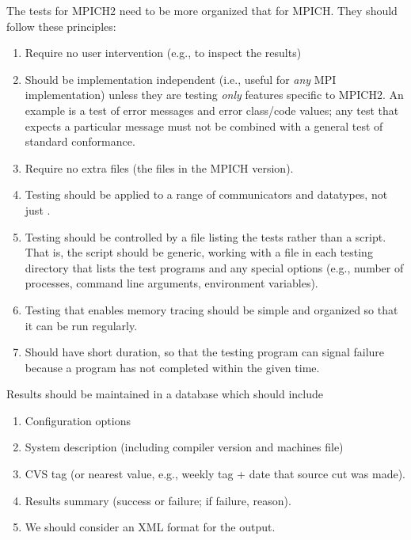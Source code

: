 \documentclass{article}
\begin{document}
The tests for MPICH2 need to be more organized that for MPICH. They
should follow these principles:
\begin{enumerate}
\item Require no user intervention (e.g., to inspect the results)
\item Should be implementation independent (i.e., useful for
\emph{any} MPI implementation) unless they are testing \emph{only}
features specific to MPICH2.  An example is a test of error messages
and error class/code values; any test that expects a particular
message must not be combined with a general test of standard
conformance.
\item Require no extra files (the  files in the MPICH
version).
\item Testing should be applied to a range of communicators and
datatypes, not just .  
\item Testing should be controlled by a file listing the tests rather
than a script.  That is, the script  should be generic,
working with a file in each testing directory that lists the test
programs and any special options (e.g., number of processes, command
line arguments, environment variables).
\item Testing that enables memory tracing should be simple and
organized so that it can be run regularly.
\item Should have short duration, so that the testing program can
signal failure because a program has not completed within the given
time.
\end{enumerate}

Results should be maintained in a database which should include
\begin{enumerate}
\item Configuration options
\item System description (including compiler version and machines file)
\item CVS tag (or nearest value, e.g., weekly tag + date that source
cut was made).
\item Results summary (success or failure; if failure, reason).
\item We should consider an XML format for the output.
\end{enumerate}
\end{document}
